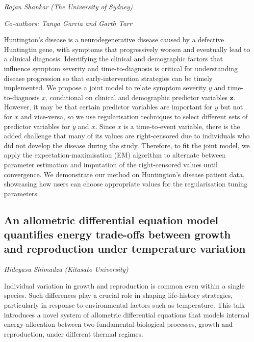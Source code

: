 \documentclass[
]{scrreprt}
\begin{document}
\emph{Rajan Shankar} \emph{(The University of
Sydney)}

\emph{Co-authors: Tanya Garcia and Garth Tarr}

\setlength{\parskip}{0.5em}

Huntington's disease is a neurodegenerative disease caused by a
defective Huntingtin gene, with symptoms that progressively worsen and
eventually lead to a clinical diagnosis. Identifying the clinical and
demographic factors that influence symptom severity and
time-to-diagnosis is critical for understanding disease progression so
that early-intervention strategies can be timely implemented. We propose
a joint model to relate symptom severity \(y\) and time-to-diagnosis
\(x\), conditional on clinical and demographic predictor variables
\(\mathbf{z}\). However, it may be that certain predictor variables are
important for \(y\) but not for \(x\) and vice-versa, so we use
regularisation techniques to select different sets of predictor
variables for \(y\) and \(x\). Since \(x\) is a time-to-event variable,
there is the added challenge that many of its values are right-censored
due to individuals who did not develop the disease during the study.
Therefore, to fit the joint model, we apply the expectation-maximisation
(EM) algorithm to alternate between parameter estimation and imputation
of the right-censored values until convergence. We demonstrate our
method on Huntington's disease patient data, showcasing how users can
choose appropriate values for the regularisation tuning parameters.

\subsection{An allometric differential equation model quantifies energy
trade-offs between growth and reproduction under temperature
variation}\label{an-allometric-differential-equation-model-quantifies-energy-trade-offs-between-growth-and-reproduction-under-temperature-variation}

\emph{Hideyasu Shimadzu} \emph{(Kitasato
University)}

\setlength{\parskip}{0.5em}

Individual variation in growth and reproduction is common even within a
single species. Such differences play a crucial role in shaping
life-history strategies, particularly in response to environmental
factors such as temperature. This talk introduces a novel system of
allometric differential equations that models internal energy allocation
between two fundamental biological processes, growth and reproduction,
under different thermal regimes.
\end{document}
